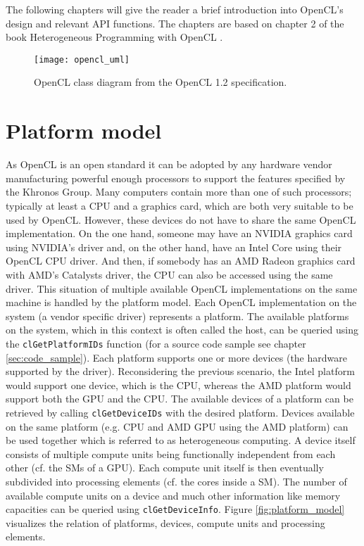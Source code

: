 The following chapters will give the reader a brief introduction into OpenCL's design and relevant API functions. The chapters are based on chapter 2 of the book Heterogeneous Programming with OpenCL \cite[p.15-31]{opencl_book}.

\begin{figure}
\centering
\texttt{[image: opencl\_uml]}
\caption{OpenCL class diagram from the OpenCL 1.2 specification. \cite{opencl_spec}}
\label{fig:opencl_uml}
\end{figure}

\section{Platform model}
As OpenCL is an open standard it can be adopted by any hardware vendor manufacturing powerful enough processors to support the features specified by the Khronos Group. Many computers contain more than one of such processors; typically at least a CPU and a graphics card, which are both very suitable to be used by OpenCL. However, these devices do not have to share the same OpenCL implementation. On the one hand, someone may have an NVIDIA graphics card using NVIDIA's driver and, on the other hand, have an Intel Core using their OpenCL CPU driver. And then, if somebody has an AMD Radeon graphics card with AMD's Catalysts driver, the CPU can also be accessed using the same driver.
This situation of multiple available OpenCL implementations on the same machine is handled by the platform model. Each OpenCL implementation on the system (a vendor specific driver) represents a platform. The available platforms on the system, which in this context is often called the host, can be queried using the \lstinline!clGetPlatformIDs! function (for a source code sample see chapter \ref{sec:code_sample}).
Each platform supports one or more devices (the hardware supported by the driver). Reconsidering the previous scenario, the Intel platform would support one device, which is the CPU, whereas the AMD platform would support both the GPU and the CPU. The available devices of a platform can be retrieved by calling \lstinline!clGetDeviceIDs! with the desired platform. Devices available on the same platform (e.g. CPU and AMD GPU using the AMD platform) can be used together which is referred to as heterogeneous computing. 
A device itself consists of multiple compute units being functionally independent from each other (cf. the SMs of a GPU). Each compute unit itself is then eventually subdivided into processing elements (cf. the cores inside a SM). The number of available compute units on a device and much other information like memory capacities can be queried using \lstinline!clGetDeviceInfo!.
Figure \ref{fig:platform_model} visualizes the relation of platforms, devices, compute units and processing elements. \cite[p.19ff]{opencl_book}

